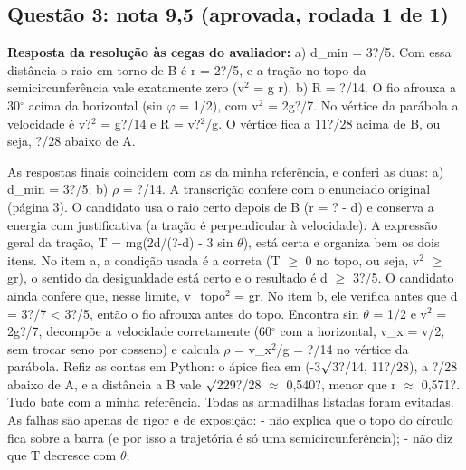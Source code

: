 \documentclass{article}%
\begin{document}
\subsection*{Questão 3: nota 9,5 (aprovada, rodada 1 de 1)}%
\textbf{Resposta da resolução às cegas do avaliador:} a) d\_min = 3?/5. Com essa distância o raio em torno de B é r = 2?/5, e a tração no topo da semicircunferência vale exatamente zero (v$^2$ = g r).\newline%
b) R = ?/14. O fio afrouxa a 30$^\circ$ acima da horizontal (sin $\varphi$ = 1/2), com v$^2$ = 2g?/7. No vértice da parábola a velocidade é v?$^2$ = g?/14 e R = v?$^2$/g. O vértice fica a 11?/28 acima de B, ou seja, ?/28 abaixo de A.\par %
As respostas finais coincidem com as da minha referência, e conferi as duas: a) d\_min = 3?/5; b) $\rho$ = ?/14. A transcrição confere com o enunciado original (página 3).\newline%
\newline%
O candidato usa o raio certo depois de B (r = ? - d) e conserva a energia com justificativa (a tração é perpendicular à velocidade). A expressão geral da tração, T = mg(2d/(?-d) - 3 sin $\theta$), está certa e organiza bem os dois itens.\newline%
\newline%
No item a, a condição usada é a correta (T $\geq$ 0 no topo, ou seja, v$^2$ $\geq$ gr), o sentido da desigualdade está certo e o resultado é d $\geq$ 3?/5. O candidato ainda confere que, nesse limite, v\_topo$^2$ = gr.\newline%
\newline%
No item b, ele verifica antes que d = 3?/7 < 3?/5, então o fio afrouxa antes do topo. Encontra sin $\theta$ = 1/2 e v$^2$ = 2g?/7, decompõe a velocidade corretamente (60$^\circ$ com a horizontal, v\_x = v/2, sem trocar seno por cosseno) e calcula $\rho$ = v\_x$^2$/g = ?/14 no vértice da parábola. Refiz as contas em Python: o ápice fica em (-3$\surd$3?/14, 11?/28), a ?/28 abaixo de A, e a distância a B vale $\surd$229?/28 $\approx$ 0,540?, menor que r $\approx$ 0,571?. Tudo bate com a minha referência.\newline%
\newline%
Todas as armadilhas listadas foram evitadas. As falhas são apenas de rigor e de exposição:\newline%
{-} não explica que o topo do círculo fica sobre a barra (e por isso a trajetória é só uma semicircunferência);\newline%
{-} não diz que T decresce com $\theta$;\newline%
\end{document}
